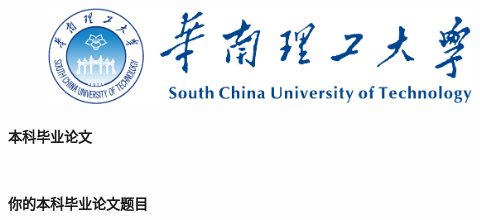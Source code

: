 \thispagestyle{empty}
\begin{figure}[ht]
\centering
\includegraphics[height=2.75cm]{images/scutlogo.pdf}
\end{figure}
\begin{center}
\textbf{本科毕业论文}
\end{center}
\nopagebreak[4]
\begin{center}
\ \\
\end{center}
\nopagebreak[4]
\begin{center}
\textbf{你的本科毕业论文题目}
\end{center}
\nopagebreak[4]
\begin{center}
\ \\\ \\\ \\
\end{center}
\nopagebreak[4]

